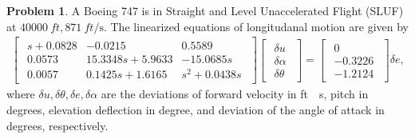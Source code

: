 \documentclass[10pt]{article}
\theoremstyle{definition}
\newtheorem{prob}{Problem}[section]
\begin{document}
\begin{prob}
    A Boeing 747 is in Straight and Level Unaccelerated Flight (SLUF) at \( \SI{40000}{ft}, \SI{871}{ft \per \second}\).
    The linearized equations of longitudanal motion are given by
    \begin{align}
        \begin{bmatrix}
            \begin{array}{ccc}
                s + 0.0828 & -0.0215 & 0.5589 \\
                0.0573 & 15.3348s + 5.9633 & -15.0685s \\
                0.0057 & 0.1425s + 1.6165 & s^2 + 0.0438s
            \end{array}
        \end{bmatrix}
        \begin{bmatrix}
            \begin{array}{c}
                \delta u \\ \delta \alpha \\ \delta \theta
            \end{array}
        \end{bmatrix}
        =
        \begin{bmatrix}
            \begin{array}{c}
                0 \\ -0.3226 \\ -1.2124
            \end{array}
        \end{bmatrix}
        \delta e ,
    \end{align}
    where \( \delta u, \delta \theta, \delta e, \delta \alpha\) are the deviations of forward velocity in \si{ft \per \second}, pitch in degrees, elevation deflection in degree, and deviation of the angle of attack in degrees, respectively.

\end{prob}
\end{document}
